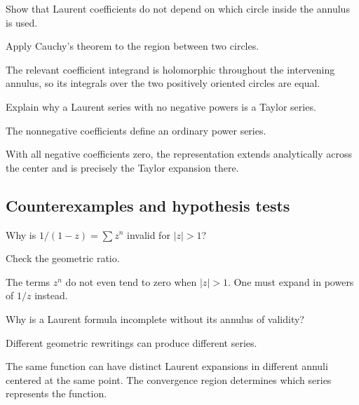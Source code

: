 \begin{exercise}\label{exr:iv08-expand-08}
Show that Laurent coefficients do not depend on which circle inside the annulus is used.
\end{exercise}
\begin{hint}
Apply Cauchy's theorem to the region between two circles.
\end{hint}
\begin{solution}
The relevant coefficient integrand is holomorphic throughout the intervening annulus, so its integrals over the two positively oriented circles are equal.
\end{solution}

\begin{exercise}\label{exr:iv08-expand-09}
Explain why a Laurent series with no negative powers is a Taylor series.
\end{exercise}
\begin{hint}
The nonnegative coefficients define an ordinary power series.
\end{hint}
\begin{solution}
With all negative coefficients zero, the representation extends analytically across the center and is precisely the Taylor expansion there.
\end{solution}

\subsection*{Counterexamples and hypothesis tests}

\begin{exercise}\label{exr:iv08-expand-10}
Why is \(1/(1-z)=\sum z^n\) invalid for \(|z|>1\)?
\end{exercise}
\begin{hint}
Check the geometric ratio.
\end{hint}
\begin{solution}
The terms \(z^n\) do not even tend to zero when \(|z|>1\). One must expand in powers of \(1/z\) instead.
\end{solution}

\begin{exercise}\label{exr:iv08-expand-11}
Why is a Laurent formula incomplete without its annulus of validity?
\end{exercise}
\begin{hint}
Different geometric rewritings can produce different series.
\end{hint}
\begin{solution}
The same function can have distinct Laurent expansions in different annuli centered at the same point. The convergence region determines which series represents the function.
\end{solution}


